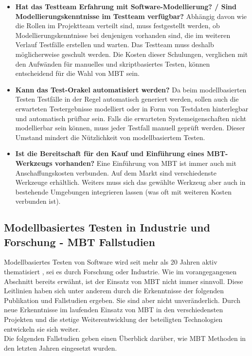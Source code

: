 \begin{itemize}
\item \textbf{Hat das Testteam Erfahrung mit Software-Modellierung? / Sind Modellierungskenntnisse im Testteam verfügbar?}
Abhängig davon wie die Rollen im Projektteam verteilt sind, muss festgestellt werden, ob Modellierungskenntnisse bei denjenigen vorhanden sind, die im weiteren Verlauf Testfälle erstellen und warten. Das Testteam muss deshalb möglicherweise geschult werden. Die Kosten dieser Schulungen, verglichen mit den Aufwänden für manuelles und skriptbasiertes Testen, können entscheidend für die Wahl von \Gls{MBT} sein.
\item \textbf{Kann das Test-Orakel automatisiert werden?}
Da beim modellbasierten Testen Testfälle in der Regel automatisch generiert werden, sollen auch die erwarteten Testergebnisse modelliert oder in Form von Testdaten hinterlegbar und automatisch prüfbar sein. Falls die erwarteten Systemeigenschaften nicht modellierbar sein können, muss jeder Testfall manuell geprüft werden. Dieser Umstand mindert die Nützlichkeit von modellbasiertem Testen.
\item \textbf{Ist die Bereitschaft für den Kauf und Einführung eines MBT-Werkzeugs vorhanden?}
Eine Einführung von \Gls{MBT} ist immer auch mit Anschaffungskosten verbunden. Auf dem Markt sind verschiedenste Werkzeuge erhältlich. Weiters muss sich das gewählte Werkzeug aber auch in bestehende Umgebungen integrieren lassen (was oft mit weiteren Kosten verbunden ist).
\end{itemize}

\subsection{Modellbasiertes Testen in Industrie und Forschung - \Gls{MBT} Fallstudien}

Modellbasiertes Testen von Software wird seit mehr als 20 Jahren aktiv thematisiert \cite{utting_practical_2007}, sei es durch Forschung oder Industrie. Wie im vorangegangenen Abschnitt bereits erwähnt, ist der Einsatz von \Gls{MBT} nicht immer sinnvoll. Diese Leitlinien haben sich unter anderem durch die Erkenntnisse der folgenden Publikation und Fallstudien ergeben. Sie sind aber nicht unveränderlich. Durch neue Erkenntnisse im laufenden Einsatz von \Gls{MBT} in den verschiedensten Projekten und die stetige Weiterentwicklung der beteiligten Technologien entwickeln sie sich weiter.\\
Die folgenden Fallstudien geben einen Überblick darüber, wie \Gls{MBT} Methoden in den letzten Jahren eingesetzt wurden.

